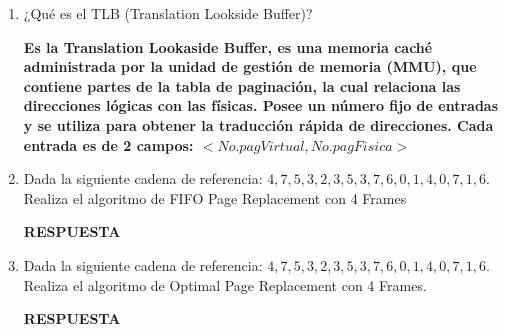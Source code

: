 \documentclass[12pt]{article}
\begin{document}
\begin{enumerate}
    \item ¿Qué es el TLB (Translation Lookside Buffer)?
    \vspace{2mm}
    
    \textbf{Es la Translation Lookaside Buffer, es una memoria caché administrada por la unidad de gestión de memoria (MMU), que contiene partes de la tabla de paginación, la cual relaciona las direcciones lógicas con las físicas. Posee un número fijo de entradas y se utiliza para obtener la traducción rápida de direcciones.
    Cada entrada es de 2 campos: $<No.pagVirtual, No.pagFisica>$}

    \item Dada la siguiente cadena de referencia: $4,7,5,3,2,3,5,3,7,6,0,1,4,0,7,1,6.$ Realiza el algoritmo de FIFO Page Replacement con 4 Frames
    \vspace{2mm}
    
    \textbf{RESPUESTA}

    \item Dada la siguiente cadena de referencia: $4,7,5,3,2,3,5,3,7,6,0,1,4,0,7,1,6.$ Realiza el algoritmo de Optimal Page Replacement con 4 Frames.
    \vspace{2mm}
    
    \textbf{RESPUESTA}

\end{enumerate}
\end{document}
